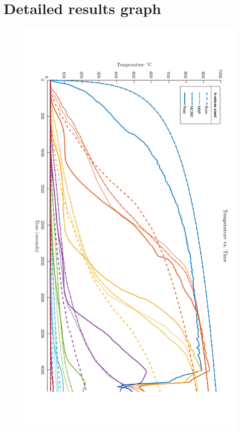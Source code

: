 \chapter{Detailed results graph}

\begin{figure}[H]
	\label{data_newk}
	\centering
	\includegraphics[width=0.5\linewidth,]{figures/final_graph_ver.png}
\end{figure}